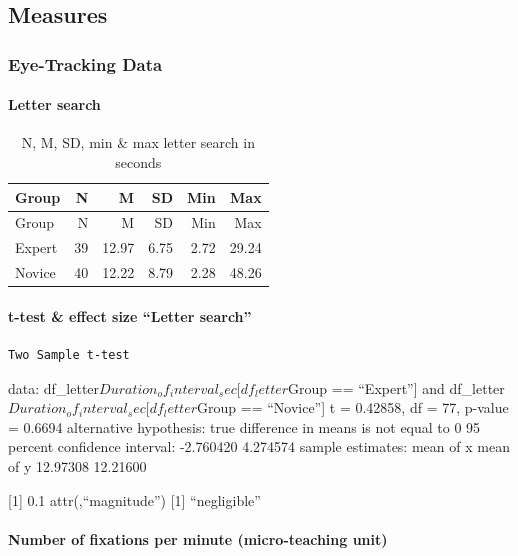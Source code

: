\documentclass[
]{article}
\begin{document}
\subsection{Measures}\label{measures}

\subsubsection{Eye-Tracking Data}\label{eye-tracking-data}

\paragraph{Letter search}\label{letter-search}

\begin{longtable}[]{@{}lrrrrr@{}}
\caption{N, M, SD, min \& max letter search in seconds}\tabularnewline
\toprule\noalign{}
Group & N & M & SD & Min & Max \\
\midrule\noalign{}
\endfirsthead
\toprule\noalign{}
Group & N & M & SD & Min & Max \\
\midrule\noalign{}
\endhead
\bottomrule\noalign{}
\endlastfoot
Expert & 39 & 12.97 & 6.75 & 2.72 & 29.24 \\
Novice & 40 & 12.22 & 8.79 & 2.28 & 48.26 \\
\end{longtable}

\paragraph{t-test \& effect size ``Letter
search''}\label{t-test-effect-size-letter-search}

\begin{verbatim}
Two Sample t-test
\end{verbatim}

data: df\_letter\(Duration_of_interval_sec[df_letter\)Group ==
``Expert''{]} and df\_letter\(Duration_of_interval_sec[df_letter\)Group
== ``Novice''{]} t = 0.42858, df = 77, p-value = 0.6694 alternative
hypothesis: true difference in means is not equal to 0 95 percent
confidence interval: -2.760420 4.274574 sample estimates: mean of x mean
of y 12.97308 12.21600

{[}1{]} 0.1 attr(,``magnitude'') {[}1{]} ``negligible''

\paragraph{Number of fixations per minute (micro-teaching
unit)}\label{number-of-fixations-per-minute-micro-teaching-unit}
\end{document}
